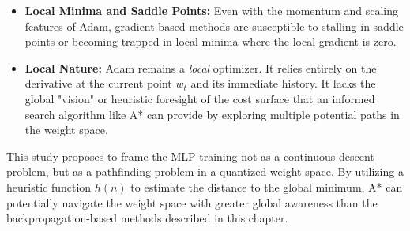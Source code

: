 \begin{itemize}
    \item \textbf{Local Minima and Saddle Points:} Even with the momentum and scaling features of Adam, gradient-based methods are susceptible to stalling in saddle points or becoming trapped in local minima where the local gradient is zero.
    \item \textbf{Local Nature:} Adam remains a \textit{local} optimizer. It relies entirely on the derivative at the current point $w_t$ and its immediate history. It lacks the global "vision" or heuristic foresight of the cost surface that an informed search algorithm like A* can provide by exploring multiple potential paths in the weight space.
\end{itemize}

This study proposes to frame the MLP training not as a continuous descent problem, but as a pathfinding problem in a quantized weight space. By utilizing a heuristic function $h(n)$ to estimate the distance to the global minimum, A* can potentially navigate the weight space with greater global awareness than the backpropagation-based methods described in this chapter.